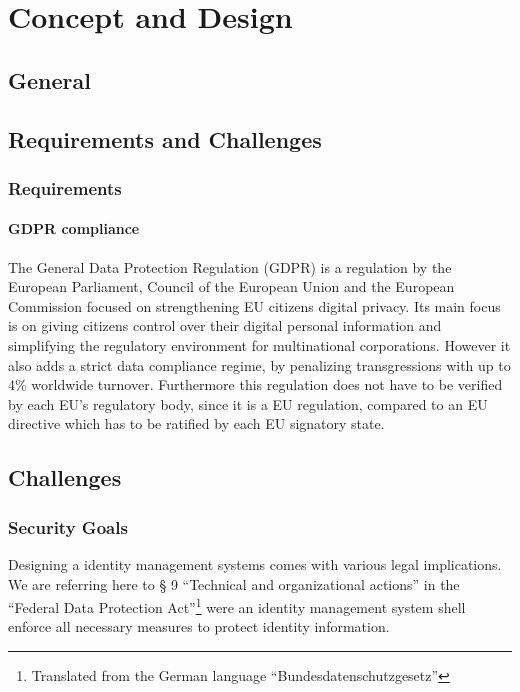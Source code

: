 \chapter{Concept and Design}
\label{cha:conceptanddesign}

\section{General}

\section{Requirements and Challenges}

\subsection{Requirements}

\subsubsection{GDPR compliance}
The General Data Protection Regulation (GDPR) is a regulation by the European Parliament, Council of the European Union and the European Commission focused on strengthening EU citizens digital privacy.  Its main focus is on giving citizens control over their digital personal information and simplifying the regulatory environment for multinational corporations. However it also adds a strict data compliance regime, by penalizing transgressions with up to 4\% worldwide turnover\cite{gdpr}. Furthermore this regulation does not have to be verified by each EU's regulatory body, since it is a EU regulation, compared to an EU directive which has to be ratified by each EU signatory state.

\section{Challenges}
\label{sec:challenges}

\subsection{Security Goals}
\label{sec:securityGoals}

Designing a identity management systems comes with various legal implications. We are referring here to § 9 “Technical and organizational actions” in the “Federal Data Protection Act”\footnote{Translated from the German language “Bundesdatenschutzgesetz”} were an identity management system shell enforce all necessary measures to protect identity information.\cite{bdsg}

